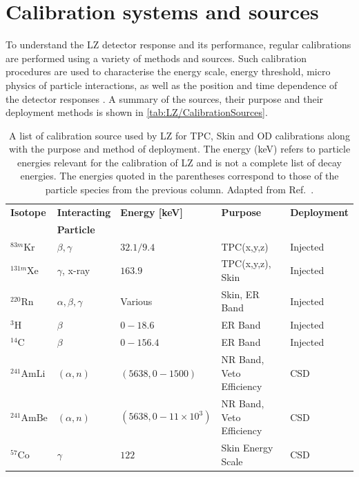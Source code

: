 \section{Calibration systems and sources}\label{sec:LZ/CalibrationSources}
To understand the LZ detector response and its performance, regular calibrations are performed using a variety of methods and sources. Such calibration procedures are used to characterise the energy scale, energy threshold, micro physics of particle interactions, as well as the position and time dependence of the detector responses \cite{LZ:2024bsz}. A summary of the sources, their purpose and their deployment methods is shown in \autoref{tab:LZ/CalibrationSources}.
\begin{table}[!ht]
    \centering
    \caption{A list of calibration source used by LZ for TPC, Skin and OD calibrations along with the purpose and method of deployment. The energy (keV) refers to particle energies relevant for the calibration of LZ and is not a complete list of decay energies. The energies quoted in the parentheses correspond to those of the particle species from the previous column. Adapted from Ref.~\cite{LZ:2024bsz,lkorley:thesis}.}
    \begin{tabular}{lllll}
         \hline\hline
         \textbf{Isotope}&\textbf{Interacting}&\textbf{Energy [keV]}&\textbf{Purpose}&\textbf{Deployment}\\
         &\textbf{Particle}& & & \\
         \hline
         $^{83m}\text{Kr}$ & $\beta, \gamma$ & $32.1/9.4$ &TPC(x,y,z) & Injected\\
         $^{131m}\text{Xe}$& $\gamma$, x-ray & $163.9$ & TPC(x,y,z), Skin & Injected\\
         $^{220}\text{Rn}$& $\alpha,\beta,\gamma$ & Various \cite{Jorg:2023nvl} & Skin, ER Band & Injected\\
         $^{3}\text{H}$& $\beta$ & $0-18.6$ &ER Band & Injected\\
         $^{14}\text{C}$& $\beta$ & $0-156.4$ &ER Band & Injected\\
         $^{241}\text{AmLi}$& $(\alpha,n)$ & $(5638, 0-1500)$ & NR Band, Veto Efficiency & CSD\\
         $^{241}\text{AmBe}$& $(\alpha,n)$ & $(5638, 0-11\times10^{3})$ & NR Band, Veto Efficiency & CSD\\
         $^{57}\text{Co}$& $\gamma$ & $122$ &Skin Energy Scale & CSD\\

\end{tabular}
\end{table}
